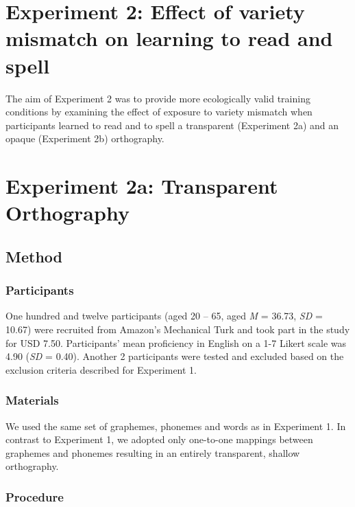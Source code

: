\documentclass[doc,floatsintext]{apa6}
\begin{document}
\section{Experiment 2: Effect of variety mismatch on learning to read
and
spell}\label{experiment-2-effect-of-variety-mismatch-on-learning-to-read-and-spell}

The aim of Experiment 2 was to provide more ecologically valid training
conditions by examining the effect of exposure to variety mismatch when
participants learned to read and to spell a transparent (Experiment 2a)
and an opaque (Experiment 2b) orthography.

\section{Experiment 2a: Transparent
Orthography}\label{experiment-2a-transparent-orthography}

\subsection{Method}\label{method-1}

\subsubsection{Participants}\label{participants-1}

One hundred and twelve participants (aged 20 -- 65, aged \emph{M} =
36.73, \emph{SD} = 10.67) were recruited from Amazon's Mechanical Turk
and took part in the study for USD 7.50. Participants' mean proficiency
in English on a 1-7 Likert scale was 4.90 (\emph{SD} = 0.40). Another 2
participants were tested and excluded based on the exclusion criteria
described for Experiment 1.

\subsubsection{Materials}\label{materials-1}

We used the same set of graphemes, phonemes and words as in Experiment
1. In contrast to Experiment 1, we adopted only one-to-one mappings
between graphemes and phonemes resulting in an entirely transparent,
shallow orthography.

\subsubsection{Procedure}\label{procedure-1}
\end{document}
